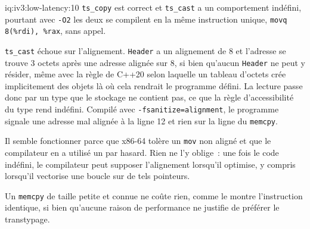 \begin{solution}{iq:iv3:low-latency:10}
\texttt{ts\_copy} est correct et \texttt{ts\_cast} a un comportement indéfini, pourtant avec \texttt{-O2} les deux se compilent en la même instruction unique, \texttt{movq 8(\%rdi), \%rax}, sans appel.

\texttt{ts\_cast} échoue sur l'alignement. \texttt{Header} a un alignement de 8 et l'adresse se trouve 3 octets après une adresse alignée sur 8, si bien qu'aucun \texttt{Header} ne peut y résider, même avec la règle de C++20 selon laquelle un tableau d'octets crée implicitement des objets là où cela rendrait le programme défini. La lecture passe donc par un type que le stockage ne contient pas, ce que la règle d'accessibilité du type rend indéfini. Compilé avec \texttt{-fsanitize=alignment}, le programme signale une adresse mal alignée à la ligne 12 et rien sur la ligne du \texttt{memcpy}.

Il semble fonctionner parce que x86-64 tolère un \texttt{mov} non aligné et que le compilateur en a utilisé un par hasard. Rien ne l'y oblige~: une fois le code indéfini, le compilateur peut supposer l'alignement lorsqu'il optimise, y compris lorsqu'il vectorise une boucle sur de tels pointeurs.

Un \texttt{memcpy} de taille petite et connue ne coûte rien, comme le montre l'instruction identique, si bien qu'aucune raison de performance ne justifie de préférer le transtypage.

\end{solution}

